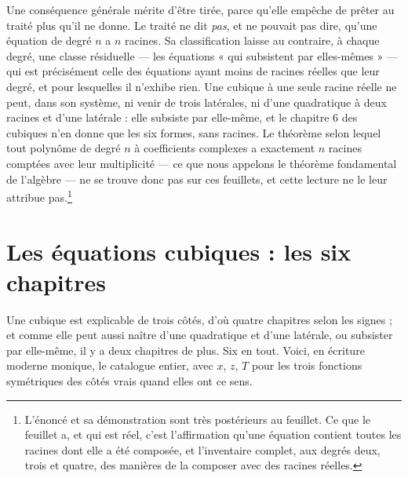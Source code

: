 \documentclass[11pt,a4paper]{article}
\begin{document}
Une conséquence générale mérite d'être tirée, parce qu'elle empêche de prêter au
traité plus qu'il ne donne. Le traité ne dit \emph{pas}, et ne pouvait pas dire,
qu'une équation de degré $n$ a $n$ racines. Sa classification laisse au
contraire, à chaque degré, une classe résiduelle — les équations « qui
subsistent par elles-mêmes » — qui est précisément celle des équations ayant
moins de racines réelles que leur degré, et pour lesquelles il n'exhibe rien.
Une cubique à une seule racine réelle ne peut, dans son système, ni venir de
trois latérales, ni d'une quadratique à deux racines et d'une latérale : elle
subsiste par elle-même, et le chapitre 6 des cubiques n'en donne que les six
formes, sans racines. Le théorème selon lequel tout polynôme de degré $n$ à
coefficients complexes a exactement $n$ racines comptées avec leur multiplicité
— ce que nous appelons le théorème fondamental de l'algèbre — ne se trouve donc
pas sur ces feuillets, et cette lecture ne le leur attribue
pas.\footnote{L'énoncé et sa démonstration sont très postérieurs au feuillet. Ce
que le feuillet a, et qui est réel, c'est l'affirmation qu'une équation contient
toutes les racines dont elle a été composée, et l'inventaire complet, aux degrés
deux, trois et quatre, des manières de la composer avec des racines réelles.}

\section*{Les équations cubiques : les six chapitres}

Une cubique est explicable de trois côtés, d'où quatre chapitres selon les
signes ; et comme elle peut aussi naître d'une quadratique et d'une latérale, ou
subsister par elle-même, il y a deux chapitres de plus. Six en tout. Voici,
en écriture moderne monique, le catalogue entier, avec $x$, $z$, $T$ pour les
trois fonctions symétriques des côtés vrais quand elles ont ce sens.
\end{document}
